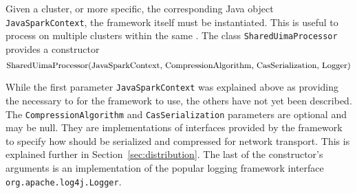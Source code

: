 Given a \spark{} cluster, or more specific, the corresponding Java object \lstinline|JavaSparkContext|, the framework itself must be instantiated. This is useful to process on multiple \spark{} clusters within the same \jvm{}. The class \lstinline|SharedUimaProcessor| provides a constructor 
\[ 
\text{\lstinline|SharedUimaProcessor(JavaSparkContext, CompressionAlgorithm, CasSerialization, Logger)|}
\]

While the first parameter \lstinline|JavaSparkContext| was explained above as providing the necessary \api{} to \spark{} for the framework to use, the others have not yet been described. The \lstinline|CompressionAlgorithm| and \lstinline|CasSerialization| parameters are optional and may be null. They are implementations of interfaces provided by the framework to specify how \cas{} should be serialized and compressed for network transport. This is explained further in Section~\ref{sec:distribution}. The last of the constructor's arguments is an implementation of the popular logging framework interface \lstinline|org.apache.log4j.Logger|.

